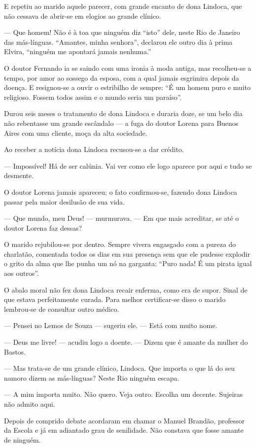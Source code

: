 E repetiu ao marido aquele parecer, com grande encanto de dona Lindoca,
que não cessava de abrir-se em elogios ao grande clínico.

--- Que homem! Não é à toa que ninguém diz ``isto'' dele, neste Rio de
Janeiro das más-línguas. ``Amantes, minha senhora'', declarou ele outro
dia à prima Elvira, ``ninguém me apontará jamais nenhuma.''

O doutor Fernando ia se saindo com uma ironia à moda antiga, mas
recolheu-se a tempo, por amor ao sossego da esposa, com a qual jamais
esgrimira depois da doença. E resignou-se a ouvir o estribilho de
sempre: ``É um homem puro e muito religioso. Fossem todos assim e o
mundo seria um paraíso''.

Durou seis meses o tratamento de dona Lindoca e duraria doze, se um belo
dia não rebentasse um grande escândalo --- a fuga do doutor Lorena para
Buenos Aires com uma cliente, moça da alta sociedade.

Ao receber a notícia dona Lindoca recusou-se a dar crédito.

--- Impossível! Há de ser calúnia. Vai ver como ele logo aparece por
aqui e tudo se desmente.

O doutor Lorena jamais apareceu; o fato confirmou-se, fazendo dona
Lindoca passar pela maior desilusão de sua vida.

--- Que mundo, meu Deus! --- murmurava. --- Em que mais acreditar, se
até o doutor Lorena faz dessas?

O marido rejubilou-se por dentro. Sempre vivera engasgado com a pureza
do charlatão, comentada todos os dias em sua presença sem que ele
pudesse explodir o grito da alma que lhe punha um nó na garganta: ``Puro
nada! É um pirata igual aos outros''.

O abalo moral não fez dona Lindoca recair enferma, como era de supor.
Sinal de que estava perfeitamente curada. Para melhor certificar-se
disso o marido lembrou-se de consultar outro médico.

--- Pensei no Lemos de Souza --- sugeriu ele. --- Está com muito nome.

--- Deus me livre! --- acudiu logo a doente. --- Dizem que é amante da
mulher do Bastos.

--- Mas trata-se de um grande clínico, Lindoca. Que importa o que lá do
seu namoro dizem as más-línguas? Neste Rio ninguém escapa.

--- A mim importa muito. Não quero. Veja outro. Escolha um decente.
Sujeiras não admito aqui.

Depois de comprido debate acordaram em chamar o Manuel Brandão,
professor da Escola e já em adiantado grau de senilidade. Não constava
que fosse amante de ninguém.

